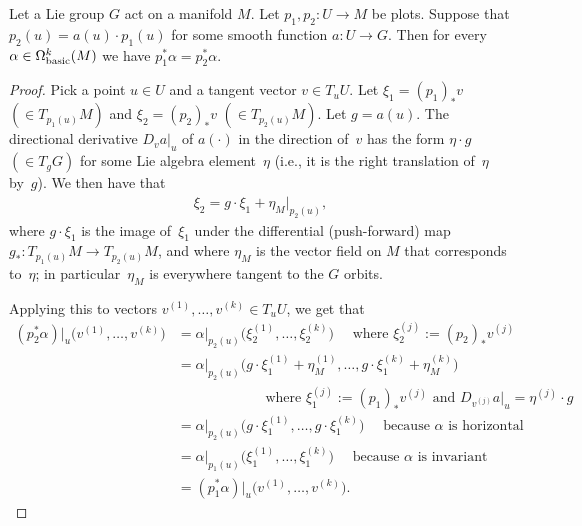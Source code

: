 \begin{Lemma}\label{l:smooth case}
Let a Lie group $G$ act on a manifold $M$.
Let $p_1, p_2 \colon U \to M$ be plots.
Suppose that $p_2(u) = a(u) \cdot p_1(u)$
for some smooth function $a \colon U \to G$.
Then for every $\alpha \in \Omega^k_{\rm basic}(M)$
we have $p_1^*\alpha = p_2^*\alpha$.
\end{Lemma}

\begin{proof}
Pick a point $u \in U$ and a tangent vector $v \in T_uU$.
Let $\xi_1 = (p_1)_*v $ $\left( \in T_{p_1(u)}M \right)$
and $\xi_2 = (p_2)_*v$ $\left( \in T_{p_2(u)}M \right)$.
Let $g = a(u)$.
The directional derivative $D_v a|_u$ of $a(\cdot)$
in the direction of~$v$ has the form $\eta \cdot g$ $\left( \in T_gG \right)$
for some Lie algebra element~$\eta$ (i.e., it is the right translation
of~$\eta$ by~$g$).
We then have that
\begin{gather*} \xi_2 = g \cdot \xi_1 + {\eta_M}|_{p_2(u)}, \end{gather*}
where $g \cdot \xi_1$ is the image of~$\xi_1$
under the dif\/ferential (push-forward) map
$ g_* \colon T_{p_1(u)}M \to T_{p_2(u)}M $,
and where $\eta_M$ is the vector f\/ield on $M$
that corresponds to~$\eta$;
in particular~$\eta_M$ is everywhere tangent to the $G$ orbits.

Applying this to vectors $v^{(1)}, \ldots, v^{(k)} \in T_uU$,
we get that
\begin{align*}
 (p_2^* \alpha)|_u \big( v^{(1)} , \ldots , v^{(k)} \big)
 &= \alpha|_{ p_2(u) } \big( \xi_2^{(1)} , \ldots ,
 \xi_2^{(k)} \big)
 \quad \text{ where } \xi_2^{(j)} := (p_2)_* v^{(j)} \\
 &= \alpha|_{ p_2(u) }
 \big( g \cdot \xi_1^{(1)} + \eta^{(1)}_M , \ldots ,
 g \cdot \xi_1^{(k)} + \eta^{(k)}_M \big) \\
 & \qquad\qquad\qquad \text{ where } \xi_1^{(j)} := (p_1)_* v^{(j)}
 \text{ and }
 D_{v^{(j)}} a|_u = \eta^{(j)} \cdot g \\
 &= \alpha|_{ p_2(u) } \big( g \cdot \xi_1^{(1)} , \ldots ,
 g \cdot \xi_1^{(k)} \big)
 \quad \text{ because $\alpha$ is horizontal } \\
 &= \alpha|_{ p_1(u) } \big( \xi_1^{(1)} , \ldots ,
 \xi_1^{(k)} \big)
 \quad \text{ because $\alpha$ is invariant } \\
 &= (p_1^* \alpha)|_u \big( v^{(1)} , \ldots , v^{(k)} \big).\tag*{\qed}
\end{align*}
 \renewcommand{\qed}{}
\end{proof}

